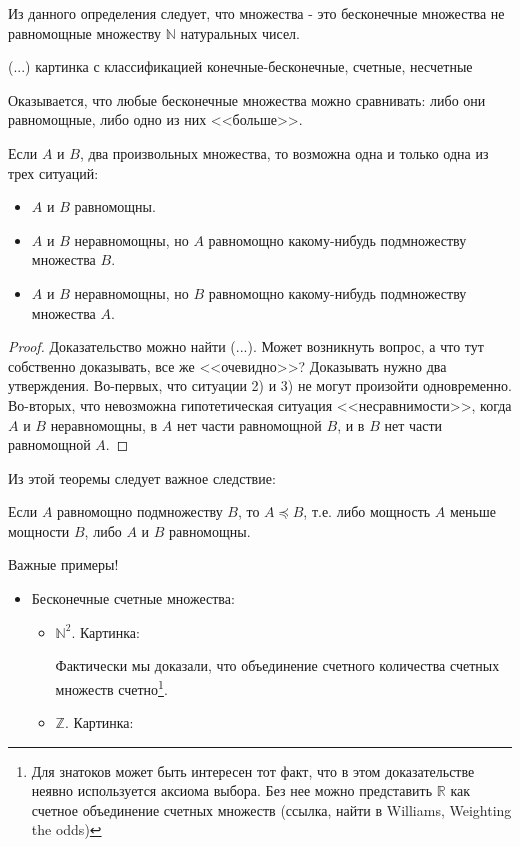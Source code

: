 {Из данного определения следует, что   множества - это бесконечные множества не равномощные множеству $\mathbb{N}$ натуральных чисел.

(...) картинка с классификацией конечные-бесконечные, счетные, несчетные

Оказывается, что любые бесконечные множества можно сравнивать: либо они равномощные, либо одно из них <<больше>>.

\begin{myth} Если $A$ и $B$, два произвольных множества, то возможна одна и только одна из трех ситуаций:
\begin{itemize}
\item[1.] $A$ и $B$ равномощны.
\item[2.] $A$ и $B$ неравномощны, но $A$ равномощно какому-нибудь подмножеству множества $B$.
\item[3.] $A$ и $B$ неравномощны, но $B$ равномощно какому-нибудь подмножеству множества $A$.
\end{itemize}
\end{myth}
\begin{proof} Доказательство можно найти (...). Может возникнуть вопрос, а что тут собственно доказывать, все же <<очевидно>>? Доказывать нужно два утверждения. Во-первых, что ситуации 2) и 3) не могут произойти одновременно. Во-вторых, что невозможна гипотетическая ситуация <<несравнимости>>, когда $A$ и $B$ неравномощны, в $A$ нет части равномощной $B$, и в $B$ нет части равномощной $A$.
\end{proof}

Из этой теоремы следует важное следствие:

\begin{myth}
Если $ A $ равномощно подмножеству $ B $, то $ A\preceq B $, т.е. либо мощность $ A$ меньше мощности $ B $, либо $ A $ и $ B $ равномощны.
\end{myth}



Важные примеры!

\begin{itemize}
\item Бесконечные счетные множества:

\begin{itemize}
\item $\mathbb{N}^{2}$. Картинка:

Фактически мы доказали, что объединение счетного количества счетных множеств счетно\footnote{Для знатоков может быть интересен тот факт, что в этом доказательстве неявно используется аксиома выбора. Без нее можно представить $\mathbb{R}$ как счетное объединение счетных множеств (ссылка, найти в Williams, Weighting the odds) }. 
\item $\mathbb{Z}$. Картинка:


\end{itemize}
\end{itemize}}
